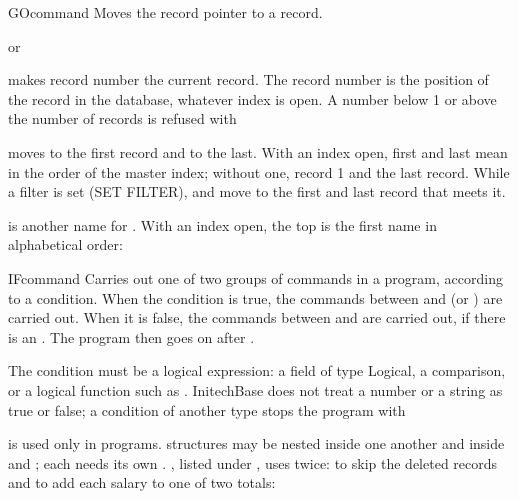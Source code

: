 \begin{XbaseEntry}{GO}{command}
%
Moves the record pointer to a record.
\Syntax
{}
\par or\par
{}
\Usage
{}  makes record number  the current record.  The
record number is the position of the record in the database, whatever index
is open.  A number below 1 or above the number of records is refused with

 moves to the first record and  to the last.  With
an index open, first and last mean in the order of the master index; without
one, record 1 and the last record.  While a filter is set (SET FILTER),
 and  move to the first and last record that meets
it.

 is another name for .
\Examples
{}
With an index open, the top is the first name in alphabetical order:
\end{XbaseEntry}

\begin{XbaseEntry}{IF}{command}
%
Carries out one of two groups of commands in a program, according to a
condition.
\Syntax
{}
\Usage
When the condition is true, the commands between  and  (or
) are carried out.  When it is false, the commands between
 and  are carried out, if there is an .  The
program then goes on after .

The condition must be a logical expression: a field of type Logical, a
comparison, or a logical function such as .  InitechBase does not
treat a number or a string as true or false; a condition of another type stops
the program with 

 is used only in programs.   structures may be nested inside one
another and inside  and ; each  needs its own
.
\Examples
{}, listed under , uses  twice: to skip
the deleted records and to add each salary to one of two totals:
\end{XbaseEntry}

